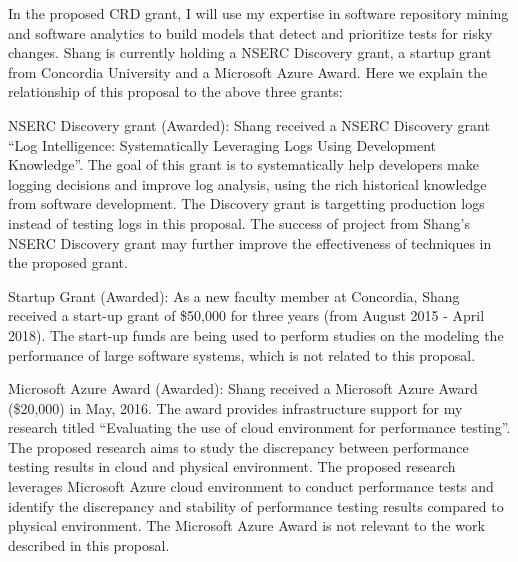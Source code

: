 \documentclass[12pt, letterpaper]{article}
\begin{document}
In the proposed CRD grant, I will use my expertise in software repository mining and software analytics to build models that detect and prioritize tests for risky changes.
Shang is currently holding a NSERC Discovery grant, a startup grant from Concordia University and a Microsoft Azure Award. Here we explain the relationship of this proposal to the above three grants:

NSERC Discovery grant (Awarded): Shang received a NSERC Discovery grant ``Log Intelligence: Systematically Leveraging Logs Using Development Knowledge''. The goal of this grant is to systematically help developers make logging decisions and improve log analysis, using the rich historical knowledge from software development. The Discovery grant is targetting production logs instead of testing logs in this proposal. The success of project from Shang's NSERC Discovery grant may further improve the effectiveness of techniques in the proposed grant.

Startup Grant (Awarded): As a new faculty member at Concordia, Shang received a start-up grant of \$50,000 for three years (from August 2015 - April 2018). The start-up funds are being used to perform studies on the modeling the performance of large software systems, which is not related to this proposal. 

Microsoft Azure Award (Awarded): Shang received a Microsoft Azure Award (\$20,000) in May, 2016. The award provides infrastructure support for my research titled ``Evaluating the use of cloud environment for performance testing''. The proposed research aims to study the discrepancy between performance testing results in cloud and physical environment. The proposed research leverages Microsoft Azure cloud environment to conduct performance tests and identify the discrepancy and stability of performance testing results compared to physical environment. The Microsoft Azure Award is not relevant to the work described in this proposal.
\end{document}
